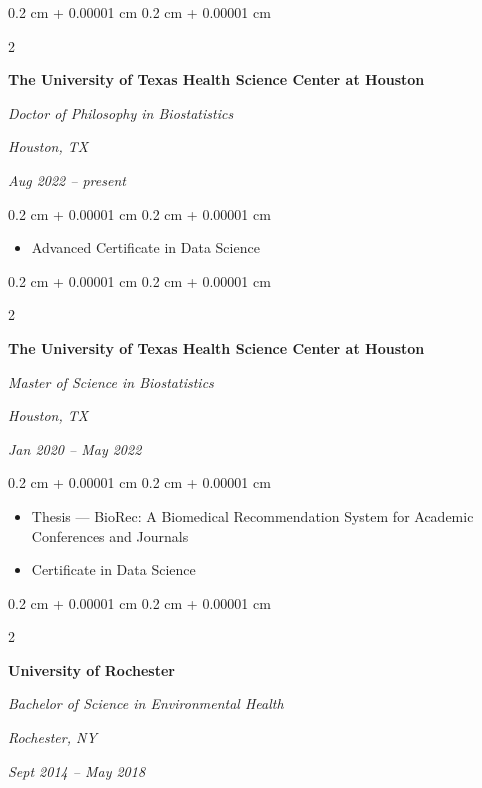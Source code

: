 \documentclass[10pt, letterpaper]{article}
\newenvironment{highlights}{
    \begin{itemize}[
        topsep=0.10 cm,
        parsep=0.10 cm,
        partopsep=0pt,
        itemsep=0pt,
        leftmargin=0.4 cm + 10pt
    ]
}{
    \end{itemize}
} %
\newenvironment{onecolentry}{
    \begin{adjustwidth}{
        0.2 cm + 0.00001 cm
    }{
        0.2 cm + 0.00001 cm
    }
}{
    \end{adjustwidth}
} %
\newenvironment{twocolentry}[2][]{
    \onecolentry
    \def\secondColumn{#2}
    \setcolumnwidth{\fill, 4.5 cm}
    \begin{paracol}{2}
}{
    \switchcolumn \raggedleft \secondColumn
    \end{paracol}
    \endonecolentry
} %
\begin{document}
        \vspace{0.2 cm}

        \begin{twocolentry}{
        \textit{Houston, TX}    
            
        \textit{Aug 2022 – present}}
            \textbf{The University of Texas Health Science Center at Houston}

            \textit{Doctor of Philosophy in Biostatistics}
        \end{twocolentry}

        \vspace{0.10 cm}
        \begin{onecolentry}
            \begin{highlights}
                \item Advanced Certificate in Data Science
            \end{highlights}
        \end{onecolentry}


        \vspace{0.2 cm}

        \begin{twocolentry}{
        \textit{Houston, TX}    
            
        \textit{Jan 2020 – May 2022}}
            \textbf{The University of Texas Health Science Center at Houston}

            \textit{Master of Science in Biostatistics}
        \end{twocolentry}

        \vspace{0.10 cm}
        \begin{onecolentry}
            \begin{highlights}
                \item Thesis — BioRec: A Biomedical Recommendation System for Academic Conferences and Journals
                \item Certificate in Data Science
            \end{highlights}
        \end{onecolentry}


        \vspace{0.2 cm}

        \begin{twocolentry}{
        \textit{Rochester, NY}    
            
        \textit{Sept 2014 – May 2018}}
            \textbf{University of Rochester}

            \textit{Bachelor of Science in Environmental Health}
        \end{twocolentry}
\end{document}
